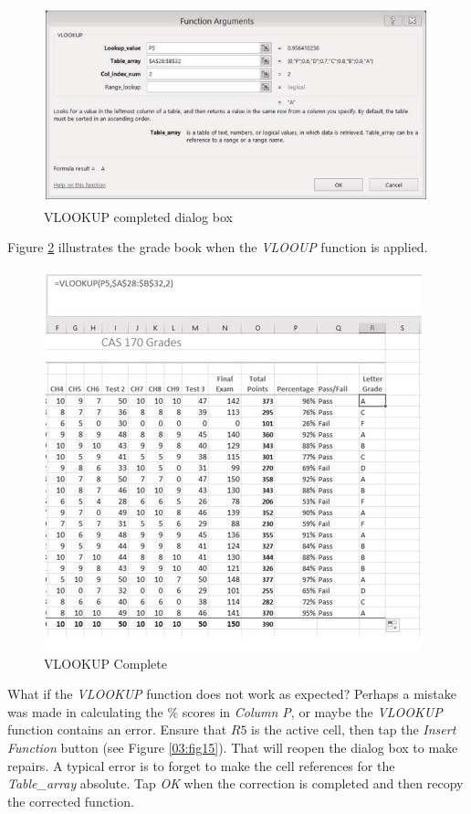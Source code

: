 \begin{figure}[H]
	\centering
	\includegraphics[width=\maxwidth{.95\linewidth}]{gfx/ch03_fig13}
	\caption{VLOOKUP completed dialog box}
	\label{03:fig13}
\end{figure}

Figure \ref{03:fig14} illustrates the grade book when the \textit{VLOOUP} function is applied.

\begin{figure}[H]
	\centering
	\includegraphics[width=\maxwidth{.95\linewidth}]{gfx/ch03_fig14}
	\caption{VLOOKUP Complete}
	\label{03:fig14}
\end{figure}

What if the \textit{VLOOKUP} function does not work as expected? Perhaps a mistake was made in calculating the \% scores in \textit{Column P}, or maybe the \textit{VLOOKUP} function contains an error. Ensure that $ R5 $ is the active cell, then tap the \textit{Insert Function} button (see Figure \ref{03:fig15}). That will reopen the dialog box to make repairs. A typical error is to forget to make the cell references for the \textit{Table\_array} absolute. Tap \textit{OK} when the correction is completed and then recopy the corrected function.

